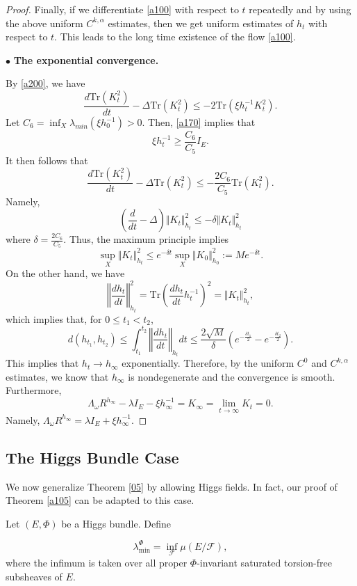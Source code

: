 \documentclass[11pt]{amsart}
\numberwithin{equation}{section}
\theoremstyle{remark}
\newcommand{\lb}{\left (}
\newcommand{\rb}{\right )}
\newcommand{\ga}{\alpha}
\newcommand{\gd}{\delta}
\newcommand{\tr}{\text{Tr}}
\begin{document}
\begin{proof}
Finally, if we differentiate \eqref{a100} with respect to $t$ repeatedly and by using the above uniform $C^{k,\ga}$ estimates, then we get uniform estimates of $h_t$ with respect to $t$. This leads to the long time existence of the flow \eqref{a100}.

\medskip
\noindent $\bullet$\textbf{ The exponential convergence.}

\smallskip
By \eqref{a200}, we have
\[
\frac{d \tr\lb K_t^2\rb}{dt}-\Delta \tr\lb K_t^2\rb\leq -2\tr \lb \xi h_t^{-1}K_t^2\rb.
\]
Let $C_6=\inf_X \lambda_{min}\lb \xi h_0^{-1}\rb>0$. Then, \eqref{a170} implies that
\[\xi h_t^{-1}\geq \frac{C_6}{C_5}I_E.
\]
It then follows that
\[
\frac{d \tr\lb K_t^2\rb}{dt}-\Delta \tr\lb K_t^2\rb\leq -\frac{2C_6}{C_5}\tr\lb K_t^2\rb.
\]
Namely,
\[
\lb \frac{d}{dt}-\Delta\rb \Vert K_t\Vert_{h_t}^2\leq -\gd \Vert K_t\Vert_{h_t}^2
\]
where $\gd=\frac{2C_6}{C_5}$. Thus, the maximum principle implies
\[
\sup_X \Vert K_t\Vert_{h_t}^2\leq e^{-\gd t}\sup_X \Vert K_0\Vert_{h_0}^2:=M e^{-\gd t}.
\]
On the other hand, we have
\[
\left \Vert \frac{dh_t}{dt}\right \Vert_{h_t}^2 =\tr \lb \frac{dh_t}{dt}h_t^{-1}\rb^2=\Vert K_t\Vert_{h_t}^2,
\]
which implies that, for $0\leq t_1<t_2$,
\[
d\lb h_{t_1}, h_{t_2}\rb\leq \int_{t_1}^{t_2} \left \Vert \frac{dh_t}{dt}\right \Vert_{h_t}dt\leq
\frac{2\sqrt M}{\gd}\lb e^{-\frac{\gd t_1}{2}}-e^{-\frac{\gd t_2}{2}}\rb.
\]
This implies that $h_t\to h_\infty$ exponentially. Therefore, by the uniform $C^0$ and $C^{k,\ga}$ estimates,  we know that $h_\infty$ is nondegenerate and the convergence is smooth. Furthermore,
\[
\Lambda_\omega R^{h_\infty}-\lambda I_E-\xi h_{\infty}^{-1}=K_\infty=\lim_{t\to\infty} K_t=0.
\]
Namely, $\Lambda_\omega  R^{h_\infty}=\lambda I_E+\xi h_{\infty}^{-1}$.

\end{proof}


\subsection{The Higgs Bundle Case}

We now generalize Theorem \ref{05} by allowing Higgs fields. In fact, our proof of Theorem \ref{a105} can be adapted to this case.  


Let $(E, \Phi)$ be a Higgs bundle. Define 

\[\lambda_{\min}^\Phi=\inf_{\mathcal F}\mu\lb E/\mathcal F\rb,
\] where the infimum is taken over all proper $\Phi$-invariant saturated torsion-free subsheaves of $E$.
\end{document}
